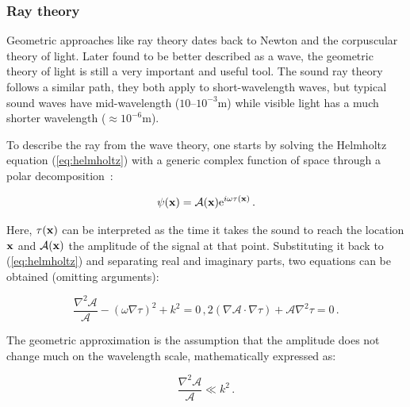 \subsubsection{Ray theory}
\label{sss:raytheory}

Geometric approaches like ray theory dates back to Newton and the corpuscular
theory of light. Later found to be better described as a wave, the geometric
theory of light is still a very important and useful tool. The sound ray theory
follows a similar path, they both apply to short-wavelength waves, but typical
sound waves have mid-wavelength ($10$--$10^{-3}$m) while visible light has a
much shorter wavelength ($\approx10^{-6}$m).

To describe the ray from the wave theory, one starts by solving the Helmholtz
equation (\ref{eq:helmholtz}) with a generic complex function of space
through a polar decomposition~\cite{buckingham1992ocean,torres2007modeling}:

\begin{equation}
\label{eq:psi}
\psi(\mathrm{\mathbf{x}}) = \mathcal{A}(\mathrm{\mathbf{x}})\mathrm{e}^{i\omega\tau(\mathrm{\mathbf{x}})}\,.
\end{equation}


Here, $\tau(\mathrm{\mathbf{x}})$ can be interpreted as the time it takes the sound to
reach the location $\mathrm{\mathbf{x}}$ and $\mathcal{A}(\mathrm{\mathbf{x}})$ the amplitude of the
signal at that point. Substituting it back to (\ref{eq:helmholtz}) and
separating real and imaginary parts, two equations can be obtained (omitting
arguments):

\begin{subequations}
\begin{equation}
\label{eq:preeikonal}
\frac{\nabla^2\mathcal{A}}{\mathcal{A}} - (\omega\nabla \tau)^2 + k^2 = 0\,,
\end{equation}

\begin{equation}
\label{eq:preeikonalamp}
2(\nabla\mathcal{A} \cdot \nabla \tau) + \mathcal{A}\nabla^2 \tau = 0\,.
\end{equation}
\end{subequations}

The geometric approximation is the assumption that the amplitude does not change
much on the wavelength scale, mathematically expressed as:

\begin{equation}
\label{eq:highfrequency}
\frac{\nabla^2\mathcal{A}}{\mathcal{A}} \ll k^2\,.
\end{equation}

